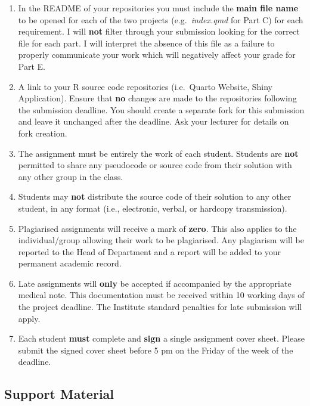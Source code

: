 \documentclass[
  letterpaper,
  DIV=11,
  numbers=noendperiod]{scrartcl}
\providecommand{\tightlist}{%
  \setlength{\itemsep}{0pt}\setlength{\parskip}{0pt}}\usepackage{longtable,booktabs,array}
\begin{document}
\begin{enumerate}
\def\labelenumi{\arabic{enumi}.}
\tightlist
\item
  In the README of your repositories you must include the \textbf{main
  file name} to be opened for each of the two projects
  (e.g.~\emph{index.qmd} for Part C) for each requirement. I will
  \textbf{not} filter through your submission looking for the correct
  file for each part. I will interpret the absence of this file as a
  failure to properly communicate your work which will negatively affect
  your grade for Part E.
\item
  A link to your R source code repositories (i.e.~Quarto Website, Shiny
  Application). Ensure that \textbf{no} changes are made to the
  repositories following the submission deadline. You should create a
  separate fork for this submission and leave it unchanged after the
  deadline. Ask your lecturer for details on fork creation.
\item
  The assignment must be entirely the work of each student. Students are
  \textbf{not} permitted to share any pseudocode or source code from
  their solution with any other group in the class.
\item
  Students may \textbf{not} distribute the source code of their solution
  to any other student, in any format (i.e., electronic, verbal, or
  hardcopy transmission).
\item
  Plagiarised assignments will receive a mark of \textbf{zero}. This
  also applies to the individual/group allowing their work to be
  plagiarised. Any plagiarism will be reported to the Head of Department
  and a report will be added to your permanent academic record.
\item
  Late assignments will \textbf{only} be accepted if accompanied by the
  appropriate medical note. This documentation must be received within
  10 working days of the project deadline. The Institute standard
  penalties for late submission will apply.
\item
  Each student \textbf{must} complete and \textbf{sign} a single
  assignment cover sheet. Please submit the signed cover sheet before 5
  pm on the Friday of the week of the deadline.
\end{enumerate}

\subsection{Support Material}\label{support-material}
\end{document}
